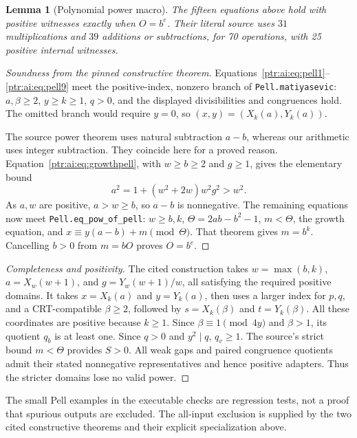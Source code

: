 \documentclass[11pt,letterpaper]{article}
\newtheorem{lemma}[theorem]{Lemma}
\theoremstyle{definition}\newtheorem{definition}[theorem]{Definition}
\theoremstyle{remark}\newtheorem{remark}[theorem]{Remark}
\newcommand{\codeu}[1]{\nolinkurl{#1}}
\begin{document}
\begin{lemma}[Polynomial power macro]\label{ptr:ai:lem:exp}
The fifteen equations above hold with positive witnesses exactly when $O=b^e$. Their literal source uses $31$ multiplications and $39$ additions or subtractions, for 70 operations, with 25 positive internal witnesses.
\end{lemma}
\begin{proof}[Soundness from the pinned constructive theorem]
Equations~\eqref{ptr:ai:eq:pell1}--\eqref{ptr:ai:eq:pell9} meet the positive-index, nonzero branch of \codeu{Pell.matiyasevic}: $a,\beta\ge2$, $y\ge k\ge1$, $q>0$, and the displayed divisibilities and congruences hold. The omitted branch would require $y=0$, so $(x,y)=(X_k(a),Y_k(a))$.

The source power theorem uses natural subtraction $a-b$, whereas our arithmetic uses integer subtraction. They coincide here for a proved reason. Equation~\eqref{ptr:ai:eq:growthpell}, with $w\ge b\ge2$ and $g\ge1$, gives the elementary bound
\[
 a^2=1+(w^2+2w)w^2g^2>w^2.
\]
As $a,w$ are positive, $a>w\ge b$, so $a-b$ is nonnegative.
The remaining equations now meet \codeu{Pell.eq_pow_of_pell}: $w\ge b,k$, $\Theta=2ab-b^2-1$, $m<\Theta$, the growth equation, and $x\equiv y(a-b)+m\pmod\Theta$. That theorem gives $m=b^k$. Cancelling $b>0$ from $m=bO$ proves $O=b^e$.
\end{proof}
\begin{proof}[Completeness and positivity]
The cited construction takes $w=\max(b,k)$, $a=X_w(w+1)$, and $g=Y_w(w+1)/w$, all satisfying the required positive domains. It takes $x=X_k(a)$ and $y=Y_k(a)$, then uses a larger index for $p,q$, and a CRT-compatible $\beta\ge2$, followed by $s=X_k(\beta)$ and $t=Y_k(\beta)$. All these coordinates are positive because $k\ge1$. Since $\beta\equiv1\pmod{4y}$ and $\beta>1$, its quotient $q_b$ is at least one. Since $q>0$ and $y^2\mid q$, $q_v\ge1$. The source's strict bound $m<\Theta$ provides $S>0$. All weak gaps and paired congruence quotients admit their stated nonnegative representatives and hence positive adapters. Thus the stricter domains lose no valid power.
\end{proof}
The small Pell examples in the executable checks are regression tests, not a proof that spurious outputs are excluded. The all-input exclusion is supplied by the two cited constructive theorems and their explicit specialization above.
\end{document}
